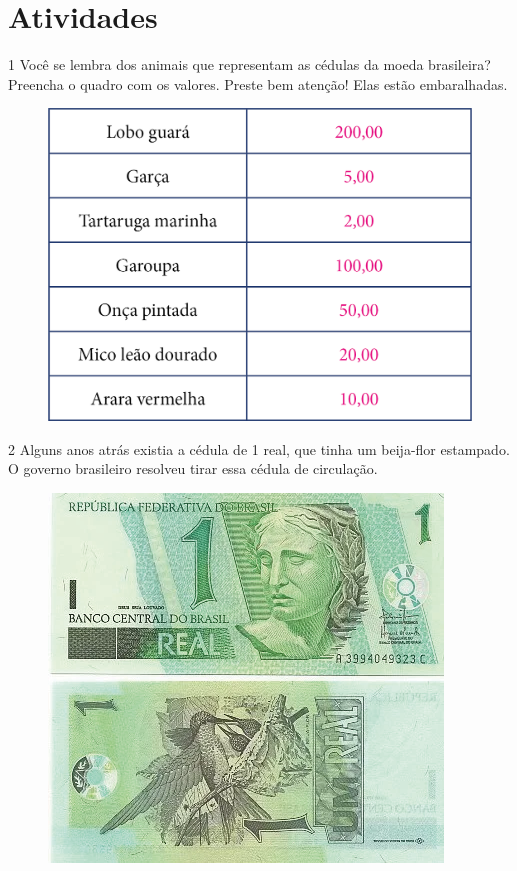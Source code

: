 \section*{Atividades}

\num{1} Você se lembra dos animais que representam as cédulas da moeda
brasileira? Preencha o quadro com os valores. Preste bem atenção!
Elas estão embaralhadas.

\begin{figure}[htpb!]
\centering
\includegraphics[width=.7\textwidth]{./media/image63.png}
\end{figure}


\pagebreak
\num{2} Alguns anos atrás existia a cédula de 1 real, que tinha um beija-flor
estampado. O governo brasileiro resolveu tirar essa cédula de circulação.


\begin{figure}[htpb!]
\centering
\includegraphics[width=.4\textwidth]{./media/image64.png}
\end{figure}

